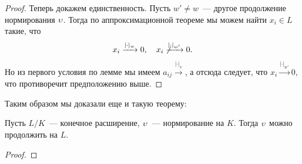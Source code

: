 \begin{proof}
 	Теперь докажем единственность. Пусть $w' \neq w$~--- другое продолжение нормирования $\upsilon$. Тогда по аппроксимационной теореме мы можем найти $x_i \in L$ такие, что 
 	\[
 		x_i \xrightarrow{|\cdot|_w} 0, \quad x_i \not\xrightarrow{|\cdot|_{w'}} 0.
 	\]
 	Но из первого условия по лемме мы имеем $a_{i j} \xrightarrow{|\cdot|_{v}}$, а отсюда следует, что $x_i \xrightarrow{|\cdot|_{w'}} 0$, что противоречит предположению выше. 


 	\end{proof} 

 	Таким образом мы доказали еще и такую теорему:

 	\begin{theorem} 
 		Пусть $L/K$~--- конечное расширение, $\upsilon$~--- нормирование на $K$. Тогда $\upsilon$ можно продолжить на $L$.
 	\end{theorem}

 	\begin{proof}
 		
 	\end{proof}

